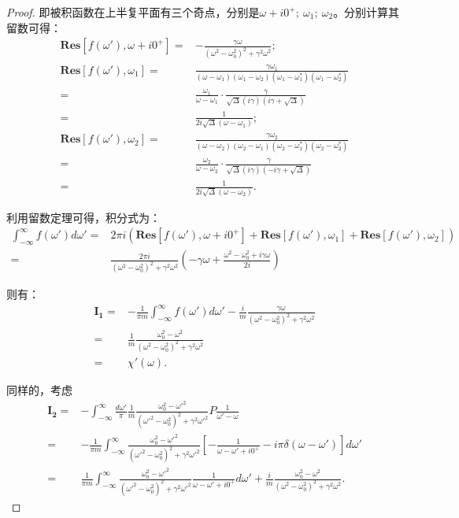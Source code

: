 \documentclass[reqno,a4paper,12pt]{amsart}
\begin{document}
\begin{proof}
即被积函数在上半复平面有三个奇点，分别是$\omega+i0^+; \ \omega_1; \ \omega_2$。分别计算其留数可得：
\begin{align*}
	\mathbf{Res}[f(\omega'), \omega+i0^+] =& -\frac{\gamma\omega}{(\omega^2-\omega_0^2)^2 + \gamma^2\omega^2}; \\
	\mathbf{Res}[f(\omega'), \omega_1] =& \frac{\gamma\omega_1}{(\omega-\omega_1)(\omega_1-\omega_2)(\omega_1-\omega_1^*)(\omega_1-\omega_2^*)} \\
	=& \frac{\omega_1}{\omega-\omega_1} \cdot \frac{\gamma}{\sqrt{\Delta} (i\gamma)(i\gamma+\sqrt{\Delta})} \\
	=& \frac{1}{2i\sqrt{\Delta}(\omega-\omega_1)}; \\
	\mathbf{Res}[f(\omega'), \omega_2] =& \frac{\gamma\omega_2}{(\omega-\omega_2)(\omega_2-\omega_1)(\omega_2-\omega_1^*)(\omega_2-\omega_2^*)} \\
	=& \frac{\omega_2}{\omega-\omega_2} \cdot \frac{\gamma}{\sqrt{\Delta} (i\gamma)(-i\gamma+\sqrt{\Delta})} \\
	=& \frac{1}{2i\sqrt{\Delta}(\omega-\omega_2)}.
\end{align*}

利用留数定理可得，积分式为：
\begin{align*}
	\int_{-\infty}^\infty f(\omega') d\omega' =& 2\pi i(\mathbf{Res}[f(\omega'), \omega+i0^+] + \mathbf{Res}[f(\omega'), \omega_1] + \mathbf{Res}[f(\omega'), \omega_2]) \\
	=& \frac{2\pi i}{(\omega^2-\omega_0^2)^2 + \gamma^2\omega^2} \left( -\gamma\omega + \frac{\omega^2-\omega_0^2+i\gamma\omega}{2i} \right)
\end{align*}

则有：
\begin{align*}
	\mathbf{I_1} =& -\frac{1}{\pi m} \int_{-\infty}^\infty f(\omega') d\omega' - \frac{i}{m}\frac{\gamma\omega}{(\omega^2-\omega_0^2)^2 + \gamma^2\omega^2} \\
	=& \frac{1}{m} \frac{\omega_0^2 - \omega^2}{(\omega^2-\omega_0^2)^2 + \gamma^2\omega^2} \\
	=& \chi'(\omega).
\end{align*}

同样的，考虑
\begin{align*}
	\mathbf{I_2} =& -\int_{-\infty}^{\infty} \frac{d\omega'}{\pi} \frac{1}{m} \frac{\omega_0^2-\omega'^2}{(\omega'^2-\omega_0^2)^2 + \gamma^2\omega'^2} P \frac{1}{\omega'-\omega} \\
	=& -\frac{1}{\pi m} \int_{-\infty}^{\infty} \frac{\omega_0^2-\omega'^2}{(\omega'^2-\omega_0^2)^2 + \gamma^2\omega'^2} \left[ -\frac{1}{\omega-\omega'+i0^+} - i\pi\delta(\omega-\omega') \right] d\omega' \\
	=& \frac{1}{\pi m} \int_{-\infty}^{\infty} \frac{\omega_0^2-\omega'^2}{(\omega'^2-\omega_0^2)^2 + \gamma^2\omega'^2} \frac{1}{\omega-\omega'+i0^+} d\omega' + \frac{i}{m}\frac{\omega_0^2-\omega^2}{(\omega^2-\omega_0^2)^2 + \gamma^2\omega^2}.
\end{align*}


\end{proof}
\end{document}
